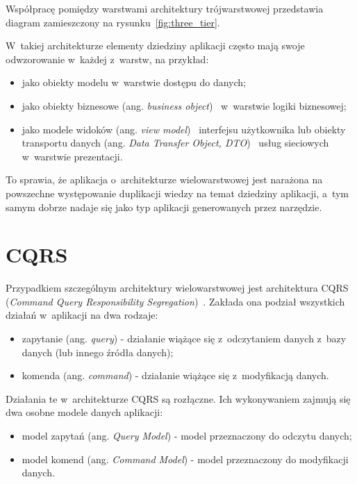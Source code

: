 Współpracę pomiędzy warstwami architektury trójwarstwowej przedstawia diagram zamieszczony na rysunku~\ref{fig:three_tier}.



W~takiej architekturze elementy dziedziny aplikacji często mają swoje odwzorowanie w~każdej z~warstw, na przykład:

\begin{itemize}
 \item jako obiekty modelu w~warstwie dostępu do danych;
 \item jako obiekty biznesowe (ang. \emph{business object})~\cite{business_object} w~warstwie logiki biznesowej;
 \item jako modele widoków (ang. \emph{view model})~\cite{view_model} interfejsu użytkownika lub obiekty transportu danych (ang. \emph{Data Transfer Object, DTO})~\cite{dto} usług sieciowych w~warstwie prezentacji.
\end{itemize}

To sprawia, że aplikacja o~architekturze wielowarstwowej jest narażona na powszechne występowanie duplikacji wiedzy na temat dziedziny aplikacji, a~tym samym dobrze nadaje się jako typ aplikacji generowanych przez narzędzie.



\section{CQRS} \label{sec:cqrs}

Przypadkiem szczególnym architektury wielowarstwowej jest architektura CQRS (\emph{Command Query Responsibility Segregation})~\cite{cqrs_journey}.
Zakłada ona podział wszystkich działań w~aplikacji na dwa rodzaje:

\begin{itemize}
 \item zapytanie (ang. \emph{query}) - działanie wiążące się z~odczytaniem danych z~bazy danych (lub innego źródła danych);
 \item komenda (ang. \emph{command}) - działanie wiążące się z~modyfikacją danych.
\end{itemize}

Działania te w~architekturze CQRS są rozłączne.
Ich wykonywaniem zajmują się dwa osobne modele danych aplikacji:

\begin{itemize}
 \item model zapytań (ang. \emph{Query Model}) - model przeznaczony do odczytu danych;
 \item model komend (ang. \emph{Command Model}) - model przeznaczony do modyfikacji danych.
\end{itemize}

